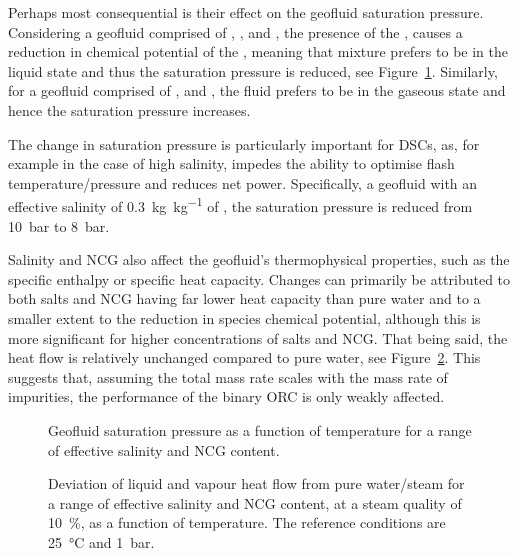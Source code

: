     Perhaps most consequential is their effect on the geofluid saturation pressure. Considering a geofluid comprised of , ,  and , the presence of the ,  causes a reduction in chemical potential of the , meaning that mixture prefers to be in the liquid state and thus the saturation pressure is reduced, see Figure~\ref{fig:prosim_aspen_Psat}. Similarly, for a geofluid comprised of ,  and , the fluid prefers to be in the gaseous state and hence the saturation pressure increases.

    The change in saturation pressure is particularly important for \ac{DSC}s, as, for example in the case of high salinity, impedes the ability to optimise flash temperature/pressure and reduces net power. Specifically, a geofluid with an effective salinity of \qty{0.3}{\kg\per\kg} of , the saturation pressure is reduced from \qty{10}{\bar} to \qty{8}{\bar}.
    
    Salinity and \ac{NCG} also affect the geofluid’s thermophysical properties, such as the specific enthalpy or specific heat capacity. Changes can primarily be attributed to both salts and \ac{NCG} having far lower heat capacity than pure water and to a smaller extent to the reduction in species chemical potential, although this is more significant for higher concentrations of salts and \ac{NCG}. That being said, the heat flow is relatively unchanged compared to pure water, see Figure~\ref{fig:prosim_aspen_Heatflow}. This suggests that, assuming the total mass rate scales with the mass rate of impurities, the performance of the binary \ac{ORC} is only weakly affected.

    \begin{figure}[H]
        \centering
        
        \caption{Geofluid saturation pressure as a function of temperature for a range of effective salinity and \ac{NCG} content.}
        \label{fig:prosim_aspen_Psat}
    \end{figure}

    \begin{figure}[H]
        \centering
        
        \caption[Deviation of liquid and vapour heat flow from pure water/steam for a range of effective salinity and \ac{NCG} content.]{Deviation of liquid and vapour heat flow from pure water/steam for a range of effective salinity and \ac{NCG} content, at a steam quality of \qty{10}{\percent}, as a function of temperature. The reference conditions are \qty{25}{\degreeCelsius} and \qty{1}{\bar}.}
        \label{fig:prosim_aspen_Heatflow}
    \end{figure}


